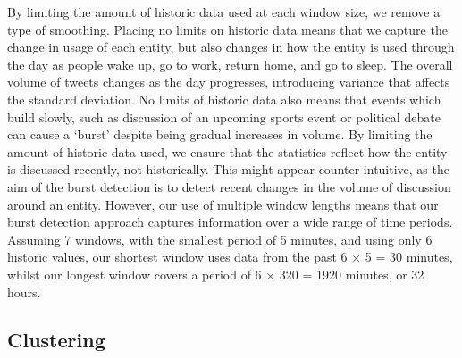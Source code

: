 By limiting the amount of historic data used at each window size, we remove a type of smoothing.
Placing no limits on historic data means that we capture the change in usage of each entity, but also changes in how the entity is used through the day as people wake up, go to work, return home, and go to sleep.
The overall volume of tweets changes as the day progresses, introducing variance that affects the standard deviation.
No limits of historic data also means that events which build slowly, such as discussion of an upcoming sports event or political debate can cause a `burst' despite being gradual increases in volume.
By limiting the amount of historic data used, we ensure that the statistics reflect how the entity is discussed recently, not historically.
This might appear counter-intuitive, as the aim of the burst detection is to detect recent changes in the volume of discussion around an entity.
However, our use of multiple window lengths means that our burst detection approach captures information over a wide range of time periods.
Assuming 7 windows, with the smallest period of 5 minutes, and using only 6 historic values, our shortest window uses data from the past 6 \(\times\) 5 = 30 minutes, whilst our longest window covers a period of 6 \(\times\) 320 = 1920 minutes, or 32 hours.


\subsection{Clustering}
\label{detection:sec:simThresholds}

